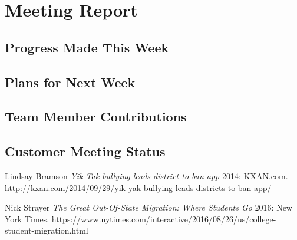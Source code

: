 \documentclass[12pt]{article}
\begin{document}
\section{Meeting Report}

\subsection{Progress Made This Week}
\subsection{Plans for Next Week}
\subsection{Team Member Contributions}
\subsection{Customer Meeting Status}

\newpage
  \begin{thebibliography}{1}

   Lindsay Bramson {\em Yik Tak bullying leads district to ban app}  2014: KXAN.com. http://kxan.com/2014/09/29/yik-yak-bullying-leads-districts-to-ban-app/

    Nick Strayer {\em The Great Out-Of-State Migration: Where Students Go} 2016:
  New York Times. https://www.nytimes.com/interactive/2016/08/26/us/college-student-migration.html

  \end{thebibliography}
\end{document}
